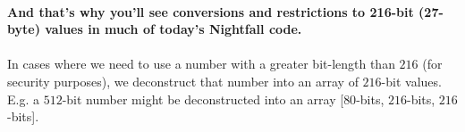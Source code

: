 \\
\textbf{And that's why you'll see conversions and restrictions to 216-bit (27-byte) values in much of today's Nightfall code.}\\
\\
In cases where we need to use a number with a greater bit-length than $216$ (for security purposes), we deconstruct that number into an array of $216$-bit values. E.g. a $512$-bit number might be deconstructed into an array [$80$-bits, $216$-bits, $216$-bits].
